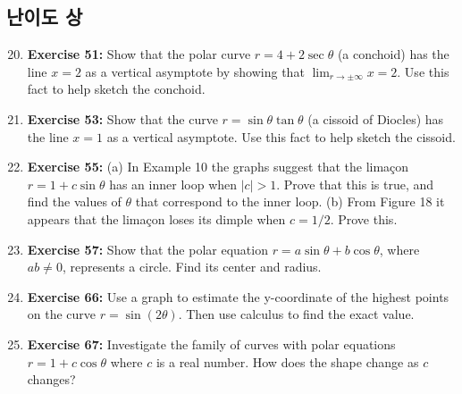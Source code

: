 \documentclass[12pt, a4paper]{article}
\begin{document}
\hrulefill
\vspace{1em}

\subsection*{난이도 상}

\begin{enumerate}
    \setcounter{enumi}{19}
    \item \textbf{Exercise 51:} Show that the polar curve $r = 4 + 2\sec\theta$ (a conchoid) has the line $x=2$ as a vertical asymptote by showing that $\lim_{r \to \pm\infty} x = 2$. Use this fact to help sketch the conchoid.

    \item \textbf{Exercise 53:} Show that the curve $r = \sin\theta\tan\theta$ (a cissoid of Diocles) has the line $x=1$ as a vertical asymptote. Use this fact to help sketch the cissoid.

    \item \textbf{Exercise 55:} (a) In Example 10 the graphs suggest that the limaçon $r=1+c\sin\theta$ has an inner loop when $|c| > 1$. Prove that this is true, and find the values of $\theta$ that correspond to the inner loop. (b) From Figure 18 it appears that the limaçon loses its dimple when $c=1/2$. Prove this.

    \item \textbf{Exercise 57:} Show that the polar equation $r = a\sin\theta + b\cos\theta$, where $ab \ne 0$, represents a circle. Find its center and radius.

    \item \textbf{Exercise 66:} Use a graph to estimate the y-coordinate of the highest points on the curve $r=\sin(2\theta)$. Then use calculus to find the exact value.

    \item \textbf{Exercise 67:} Investigate the family of curves with polar equations $r=1+c\cos\theta$ where $c$ is a real number. How does the shape change as $c$ changes?
\end{enumerate}
\end{document}
